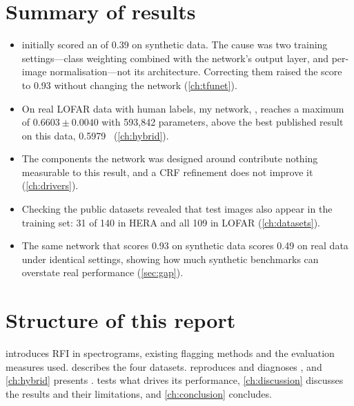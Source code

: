 \section{Summary of results}
\begin{itemize}
  \item \tfunet{} initially scored an \Fone{} of 0.39 on synthetic data. The
    cause was two training settings---class weighting combined with the
    network's output layer, and per-image normalisation---not its
    architecture. Correcting them raised the score to 0.93 without changing the
    network (\cref{ch:tfunet}).
  \item On real LOFAR data with human labels, my network, \hybrid{}, reaches
    a maximum \Fone{} of $0.6603 \pm 0.0040$ with 593{,}842 parameters, above the
    best published result on this data, 0.5979~\cite{mesarcik2022}
    (\cref{ch:hybrid}).
  \item The components the network was designed around contribute nothing
    measurable to this result, and a CRF refinement does not improve it
    (\cref{ch:drivers}).
  \item Checking the public datasets revealed that test images also appear in
    the training set: 31 of 140 in HERA and all 109 in LOFAR
    (\cref{ch:datasets}).
  \item The same network that scores 0.93 on synthetic data scores 0.49 on real
    data under identical settings, showing how much synthetic benchmarks can
    overstate real performance (\cref{sec:gap}).
\end{itemize}

\section{Structure of this report}
 introduces RFI in spectrograms, existing flagging methods
and the evaluation measures used.  describes the four
datasets.  reproduces and diagnoses \tfunet{}, and
\cref{ch:hybrid} presents \hybrid{}.  tests what drives its
performance, \cref{ch:discussion} discusses the results and their limitations,
and \cref{ch:conclusion} concludes.
